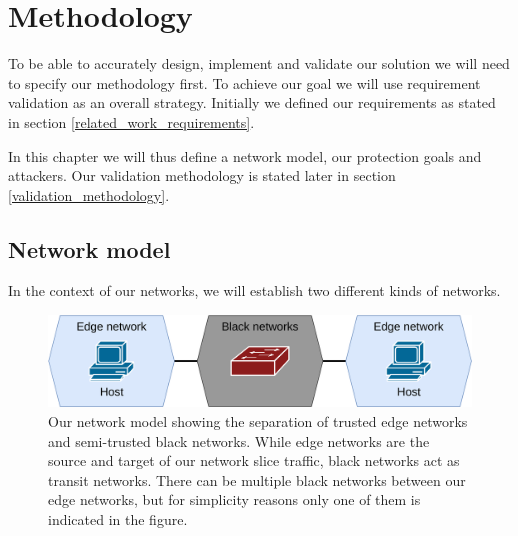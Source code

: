 \chapter{Methodology}
\label{methodology}

To be able to accurately design, implement and validate our solution we will need to specify our methodology first. To achieve our goal we will use requirement validation as an overall strategy. Initially we defined our requirements as stated in section \ref{related_work_requirements}.

In this chapter we will thus define a network model, our protection goals and attackers. Our validation methodology is stated later in section \ref{validation_methodology}.

\section{Network model}
In the context of our networks, we will establish two different kinds of networks.

\begin{figure}[ht]
  \centering
  \includegraphics[width=\textwidth]{images/chapter_4/network_model.png}
  \caption[Network model]{Our network model showing the separation of trusted edge networks and semi-trusted black networks. While edge networks are the source and target of our network slice traffic, black networks act as transit networks. There can be multiple black networks between our edge networks, but for simplicity reasons only one of them is indicated in the figure.}
  \label{fig:network_model}
\end{figure}

